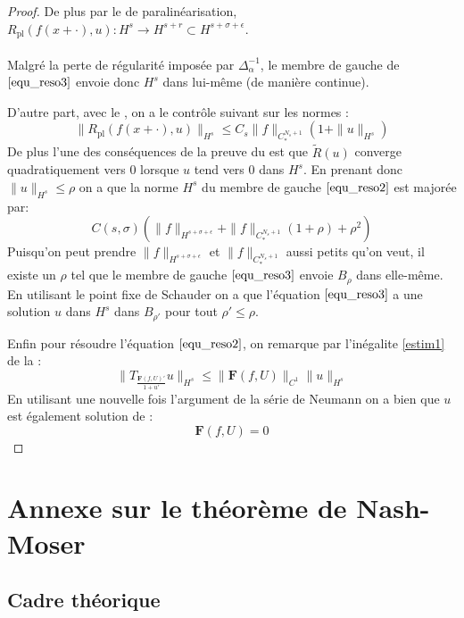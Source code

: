 \documentclass[11pt,a4paper]{article}
\begin{document}
\begin{proof}
De plus par le  de paralinéarisation, $R_{\text{pl}}(f(x+\cdot),u):  H^s \to H^{s+r} \subset H^{s+\sigma +\epsilon}$.
\\ 
\\
Malgré la perte de régularité imposée par  $\Delta_\alpha^{-1}$, le membre de gauche de $\eqref{equ_reso3}$ envoie donc $H^s$ dans lui-même (de manière continue).
\par
D'autre part, avec le , on a le contrôle suivant sur les normes :
\begin{equation*}
\|R_{\text{pl}}(f(x+\cdot),u)\|_{H^s} \leq C_s \|f\|_{C^{N_s+1}_*} (1+\|u\|_{H^s})
\end{equation*} 
De plus l'une des conséquences de la preuve du  est que $\tilde{R}(u)$ converge quadratiquement vers 0 lorsque $u$ tend vers 0 dans $H^s$. En prenant donc  $\|u\|_{H^s} \leq \rho $ on a que la norme $H^s$ du membre de gauche $\eqref{equ_reso2}$ est majorée par:
\begin{equation}
C(s,\sigma) ( \|f\|_{H^{s+\sigma+\epsilon}} +\|f\|_{C^{N_s+1}_*} (1+\rho) + \rho^2)
\end{equation} 
Puisqu'on peut prendre $\|f\|_{H^{s+\sigma+\epsilon}}$ et $\|f\|_{C^{N_s+1}_*}$ aussi petits qu'on veut, il existe un $\rho$ tel que le membre de gauche $\eqref{equ_reso3}$ envoie $B_\rho$ dans elle-même. En utilisant le point fixe de Schauder on a que l'équation $\eqref{equ_reso3}$ a une solution $u$ dans $H^s$ dans $B_{\rho'}$ pour tout $\rho' \leq \rho$. \\
\par
Enfin pour résoudre l'équation $\eqref{equ_reso2}$, on remarque par l'inégalite \eqref{estim1} de la  :
\begin{equation}
\|T_{\frac{\mathbf{F}(f,U)'}{1+u'}}u\|_{H^s} \leq \|\mathbf{F}(f,U)\|_{C^1}\|u\|_{H^s}
\end{equation}
En utilisant une nouvelle fois l'argument de la série de Neumann on a bien que $u$ est également solution de :
\begin{equation}
\mathbf{F}(f,U)=0
\end{equation}
\end{proof}

\newpage
\section{Annexe sur le théorème de Nash-Moser}
\subsection{Cadre théorique}
\end{document}
